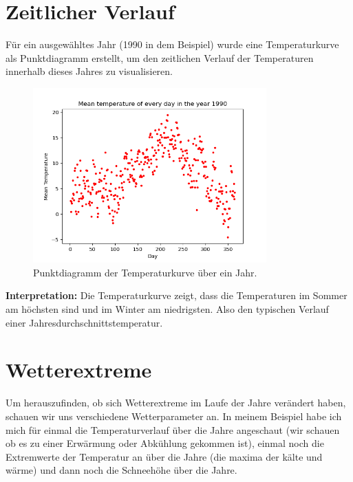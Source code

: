 \documentclass{article}
\begin{document}

\section{Zeitlicher Verlauf}
Für ein ausgewähltes Jahr (1990 in dem Beispiel) wurde eine Temperaturkurve als Punktdiagramm erstellt, 
um den zeitlichen Verlauf der Temperaturen innerhalb dieses Jahres zu visualisieren.

\begin{figure}[h!]
    \centering
    \includegraphics[width=0.8\textwidth]{A_1_2.png}
    \caption{Punktdiagramm der Temperaturkurve über ein Jahr.}
\end{figure}

\textbf {Interpretation:} Die Temperaturkurve zeigt, dass die Temperaturen im Sommer am höchsten sind und im Winter am niedrigsten. 
Also den typischen Verlauf einer Jahresdurchschnittstemperatur.

\section{Wetterextreme}
Um herauszufinden, ob sich Wetterextreme im Laufe der Jahre verändert haben, schauen wir uns verschiedene Wetterparameter an.
In meinem Beispiel habe ich mich für einmal die Temperaturverlauf über die Jahre angeschaut (wir schauen ob es zu einer Erwärmung oder Abkühlung gekommen ist),
einmal noch die Extremwerte der Temperatur an über die Jahre (die maxima der kälte und wärme) und dann noch die Schneehöhe über die Jahre. 
\end{document}
